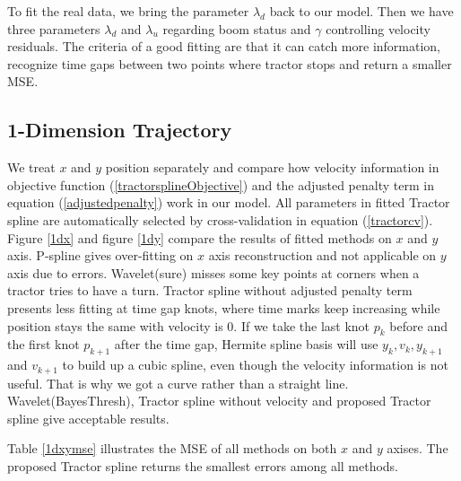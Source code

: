 To fit the real data, we bring the parameter $\lambda_d$ back to our model. Then we have three parameters $\lambda_d$ and $\lambda_u$ regarding boom status and $\gamma$ controlling velocity residuals. The criteria of a good fitting are that it can catch more information, recognize time gaps between two points where tractor stops and return a smaller MSE. 



\subsection{1-Dimension Trajectory}

We treat $x$ and $y$ position separately and compare how velocity information in objective function (\ref{tractorsplineObjective}) and the adjusted penalty term in equation (\ref{adjustedpenalty}) work in our model. All parameters in fitted Tractor spline are automatically selected by cross-validation in equation (\ref{tractorcv}). Figure \ref{1dx} and figure \ref{1dy} compare the results of fitted methods on $x$ and $y$ axis. P-spline gives over-fitting on $x$ axis reconstruction and not applicable on $y$ axis due to errors. Wavelet(sure) misses some key points at corners when a tractor tries to have a turn. Tractor spline without adjusted penalty term presents less fitting at time gap knots, where time marks keep increasing while position stays the same with velocity is 0. If we take the last knot $p_k$ before and the first knot $p_{k+1}$ after the time gap, Hermite spline basis will use $y_k, v_k, y_{k+1}$ and $v_{k+1}$ to build up a cubic spline, even though the velocity information is not useful. That is why we got a curve rather than a straight line. Wavelet(BayesThresh), Tractor spline without velocity and proposed Tractor spline give acceptable results.


Table \ref{1dxymse} illustrates the MSE of all methods on both $x$ and $y$ axises. The proposed Tractor spline returns the smallest errors among all methods.



